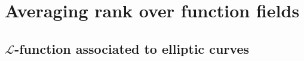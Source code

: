 \documentclass[12pt,reqno]{amsart}
\newcommand{\PP}{\mathbb{P}}
\newcommand{\BF}{\mathbb{F}}
\newcommand{\CC}{\mathcal{C}}
\begin{document}
\section{Averaging rank over function fields}

\subsection{$\mathcal{L}$-function associated to elliptic curves} 
\end{document}
